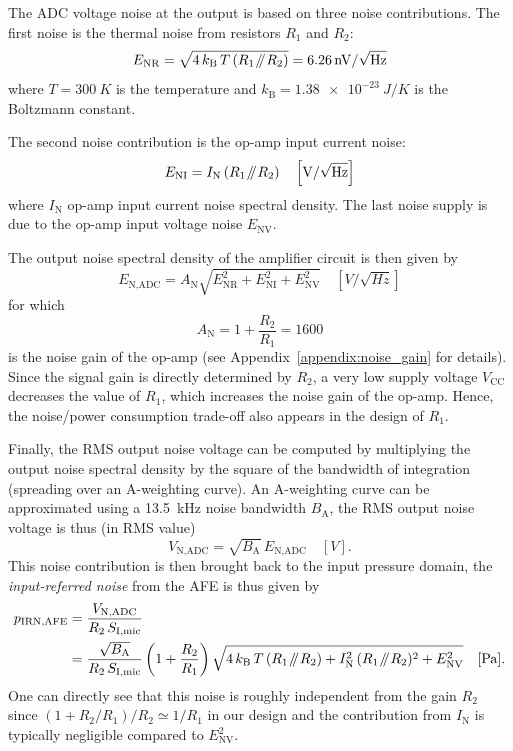 \documentclass{EPL-master-thesis-covers-EN}
\newcommand{\parallelsum}{\mathbin{\!/\mkern-5mu/\!}}
\newcommand{\te}[1]{\textrm{#1}}
\begin{document}
The ADC voltage noise at the output is based on three noise contributions. The first noise is the thermal noise from resistors $R_1$ and $R_2$:
\[
 E_\te{NR} = \sqrt{4 \, k_\te{B} \, T \, (R_1 \parallelsum R_2)} = \SI{6.26}{nV/\sqrt{Hz}}
\]
where $T = \SI{300}{K}$ is the temperature and $k_\te{B} = \SI{1.38e-23}{J/K}$ is the Boltzmann constant.

The second noise contribution is the op-amp input current noise:
\[
 E_\te{NI} = I_\te{N} \, (R_1 \parallelsum R_2) \quad \left[\si{V/\sqrt{Hz}}\right]
\]
where $I_\te{N}$ op-amp input current noise spectral density. The last noise supply is due to the op-amp input voltage noise $E_\te{NV}$.

The output noise spectral density of the amplifier circuit is then given by
\[
 E_\te{N,ADC} = A_\te{N} \sqrt{E_\te{NR}^2 + E_\te{NI}^2 + E_\te{NV}^2} \quad \left[\si{V/\sqrt{Hz}}\right]
\]
for which
\[
 A_\te{N} = 1 + \frac{R_2}{R_1} = 1600
\]
is the noise gain of the op-amp (see Appendix~\ref{appendix:noise_gain} for details). Since the signal gain is directly determined by $R_2$, a very low supply voltage $V_\te{CC}$ decreases the value of $R_1$, which increases the noise gain of the op-amp. Hence, the noise/power consumption trade-off also appears in the design of $R_1$.

Finally, the RMS output noise voltage can be computed by multiplying the output noise spectral density by the square of the bandwidth of integration (spreading over an A-weighting curve). An A-weighting curve can be approximated using a \SI{13.5}{kHz} noise bandwidth $B_\te{A}$, the RMS output noise voltage is thus (in RMS value)
\[
 V_\te{N,ADC} = \sqrt{B_\te{A}} \, E_\te{N,ADC} \quad [\si{V}].
\]
This noise contribution is then brought back to the input pressure domain, the \textit{input-referred noise} from the AFE is thus given by
\begin{align*}
  p_\te{IRN,AFE} &= \frac{V_\te{N,ADC}}{R_2\,S_{\te{I,mic}}}\\
   &= \frac{\sqrt{B_\te{A}}}{R_2\,S_{\te{I,mic}}} \left(1 + \frac{R_2}{R_1}\right) \sqrt{4 \, k_\te{B} \, T \, (R_1 \parallelsum R_2) + I_\te{N}^2 \, (R_1 \parallelsum R_2)^2 + E_\te{NV}^2} \quad \si{[Pa]}.
\end{align*}
One can directly see that this noise is roughly independent from the gain $R_2$ since $(1+R_2/R_1)/R_2\simeq 1/R_1$ in our design and the contribution from $I_\te{N}$ is typically negligible compared to $E_\te{NV}^2$.

\end{document}
